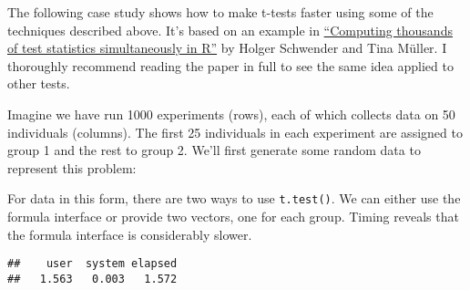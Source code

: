 The following case study shows how to make t-tests faster using some of
the techniques described above. It's based on an example in
\href{http://stat-computing.org/newsletter/issues/scgn-18-1.pdf}{``Computing
thousands of test statistics simultaneously in R''} by Holger Schwender
and Tina Müller. I thoroughly recommend reading the paper in full to see
the same idea applied to other tests. 

Imagine we have run 1000 experiments (rows), each of which collects data
on 50 individuals (columns). The first 25 individuals in each experiment
are assigned to group 1 and the rest to group 2. We'll first generate
some random data to represent this problem:

\begin{Shaded}
\begin{Highlighting}[]
\StringTok{ }
\StringTok{ }
\StringTok{ }\NormalTok{(}\OperatorTok{*}\StringTok{ } \NormalTok{, } \NormalTok{), }
\StringTok{ }\NormalTok{(}\OperatorTok{:}\NormalTok{, }\OperatorTok{/}\StringTok{ }\NormalTok{)}
\end{Highlighting}
\end{Shaded}

For data in this form, there are two ways to use \texttt{t.test()}. We
can either use the formula interface or provide two vectors, one for
each group. Timing reveals that the formula interface is considerably
slower.

\begin{Shaded}
\begin{Highlighting}[]
\NormalTok{(} \OperatorTok{:}\OperatorTok{~}\StringTok{ }\OperatorTok{$}
\end{Highlighting}
\end{Shaded}

\begin{verbatim}
##    user  system elapsed 
##   1.563   0.003   1.572
\end{verbatim}

\begin{Shaded}
\begin{Highlighting}[]
\NormalTok{(}
   \OperatorTok{:}\NormalTok{(X[i, grp }\OperatorTok{==}\StringTok{ }\NormalTok{], X[i, grp }\OperatorTok{==}\StringTok{ }\NormalTok{])}\OperatorTok{$}
\NormalTok{)}
\end{Highlighting}
\end{Shaded}

